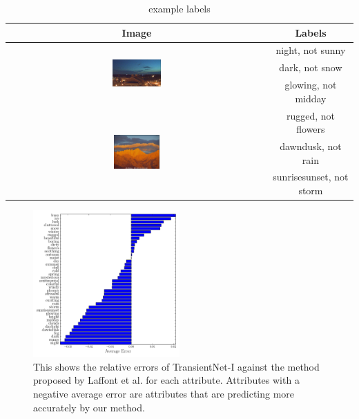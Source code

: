 \documentclass{article}
\begin{document}
\begin{table}
  \renewcommand{\arraystretch}{2}
  \centering
  \begin{tabular}[b]{| c | c |}
    \hline
    Image & Labels \\
    \hline
    \multirow{3}[3]{*}[-2mm]{\includegraphics[width=0.19\textwidth]{figs/labels_1.jpg}}
      & night, not sunny \bigstrut \\
      & dark, not snow \bigstrut  \\
      & glowing, not midday \bigstrut  \\
    \hline
    \multirow{3}[3]{*}[-2mm]{\includegraphics[width=0.18\textwidth]{figs/labels_2.jpg}}
      & rugged, not flowers \bigstrut  \\
      & dawndusk, not rain \bigstrut  \\
      & sunrisesunset, not storm  \bigstrut \\
    \hline
  \end{tabular}
  \caption{example labels}
  \label{tbl:labels}
\end{table}

\begin{figure}[t]
	\centering
		\includegraphics[width=0.5\textwidth]{figs/rel_err_cmr.pdf}
		\caption{This shows the relative errors of TransientNet-I against the method 
						 proposed by Laffont et al. for each attribute.  Attributes with a 
						 negative average error are attributes that are predicting more 
						 accurately by our method.}
		\label{fig:relerr}
\end{figure}
\end{document}
